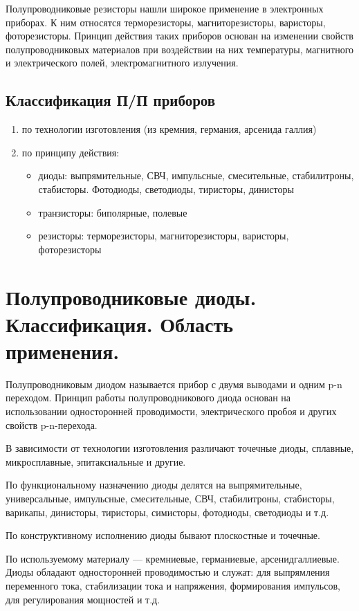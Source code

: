 Полупроводниковые резисторы нашли широкое применение в электронных приборах. К ним относятся терморезисторы, магниторезисторы, варисторы, фоторезисторы. Принцип действия таких приборов основан на изменении свойств полупроводниковых материалов при воздействии на них температуры, магнитного и электрического полей, электромагнитного излучения.

\subsection*{Классификация П/П приборов}

\begin{enumerate}
\item по технологии изготовления (из кремния, германия, арсенида галлия)
\item по принципу действия:
	\begin{itemize}
	\item диоды: выпрямительные, СВЧ, импульсные, смесительные, стабилитроны, стабисторы. Фотодиоды, светодиоды, тиристоры, динисторы
	\item транзисторы: биполярные, полевые
	\item резисторы: терморезисторы, магниторезисторы, варисторы, фоторезисторы
	\end{itemize}
\end{enumerate}


\section{Полупроводниковые диоды. Классификация. Область применения.}

Полупроводниковым диодом называется прибор с двумя выводами и одним p-n переходом. Принцип работы полупроводникового диода основан на использовании односторонней проводимости, электрического пробоя и других свойств p-n-перехода.

В зависимости от технологии изготовления различают точечные диоды, сплавные, микросплавные, эпитаксиальные и другие.

По функциональному назначению диоды делятся на выпрямительные, универсальные, импульсные, смесительные, СВЧ, стабилитроны, стабисторы, варикапы, динисторы, тиристоры, симисторы, фотодиоды, светодиоды и т.д.

По конструктивному исполнению диоды бывают плоскостные и точечные.

По используемому материалу --- кремниевые, германиевые, арсенидгаллиевые. Диоды обладают односторонней проводимостью и служат: для выпрямления переменного тока, стабилизации тока и напряжения, формирования импульсов, для регулирования мощностей и т.д.

